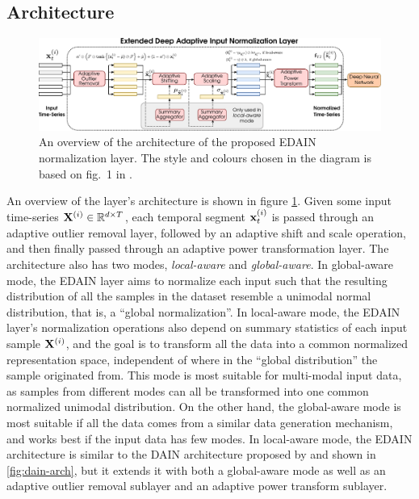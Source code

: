 \documentclass{statsmsc}
\begin{document}
{\subsection{Architecture}%
\label{sub:edain_arch}

\begin{figure}
\begin{center}
    \includegraphics[width=\textwidth]{diagrams/edain-diagram.pdf}
\end{center}
\caption{An overview of the architecture of the proposed \ac{EDAIN} normalization layer. The
style and colours chosen in the diagram is based on fig.\ 1 in \cite{dain}.}
\label{fig:edain-arch}
\end{figure}

An overview of the layer's architecture is shown in figure \cref{fig:edain-arch}.
Given some input time-series $\mathbf{X}^{(i)} \in \mathbb{R}^{d \times T}$, each temporal segment
$\mathbf{x}^{(i)}_t$ is passed through an adaptive outlier removal layer, followed by an adaptive shift
and scale operation, and then finally passed through an adaptive power transformation layer.
The architecture also has two modes, \textit{local-aware} and \textit{global-aware}. In
global-aware mode, the \ac{EDAIN} layer aims to normalize each input such that the resulting
distribution of all the samples in the dataset resemble a unimodal normal distribution, that is,
a ``global normalization''. In local-aware mode,
the \ac{EDAIN} layer's normalization operations
also depend on summary statistics of each input sample $\mathbf{X}^{(i)}$, and the goal is to transform
all the data into a common normalized representation space, independent of where in the
``global distribution'' the sample originated from. This mode is most suitable for
multi-modal input data, as samples from different modes can all be transformed into one common
normalized unimodal distribution. On the other hand, the global-aware mode
is most suitable if all the data comes from a similar data generation mechanism,
and works best if the input data has few modes.
In local-aware mode, the \ac{EDAIN} architecture is similar to the
\ac{DAIN} architecture proposed by \citeauthor{dain} and shown
in \cref{fig:dain-arch}, but it
extends it with both a global-aware mode as well as an adaptive outlier removal sublayer and
an adaptive power transform sublayer.

}
\end{document}
